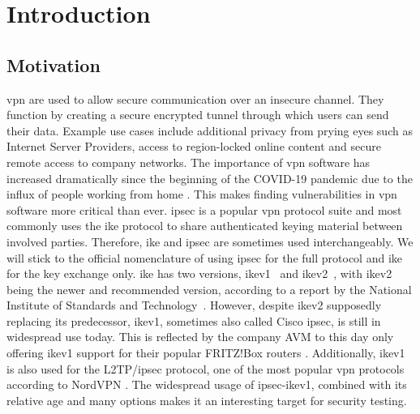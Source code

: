 %
%
% 

\chapter{Introduction}

\label{chap:Introduction}

\section{Motivation}
\ac{vpn} are used to allow secure communication over an insecure channel. They function by creating a secure encrypted tunnel through which users can send their data. Example use cases include additional privacy from prying eyes such as Internet Server Providers, access to region-locked online content and secure remote access to company networks. The importance of \ac{vpn} software has increased dramatically since the beginning of the COVID-19 pandemic due to the influx of people working from home \cite{DBLP:journals/cacm/FeldmannGLPPDWW21}. This makes finding vulnerabilities in \ac{vpn} software more critical than ever. %
\ac{ipsec} is a popular \ac{vpn} protocol suite and most commonly uses the \ac{ike} protocol to share authenticated keying material between involved parties. Therefore, \ac{ike} and \ac{ipsec} are sometimes used interchangeably. We will stick to the official nomenclature of using \ac{ipsec} for the full protocol and \ac{ike} for the key exchange only. \ac{ike} has two versions, \ac{ike}v1~\cite{rfc:ikev1} and \ac{ike}v2~\cite{rfc:ikev2}, with \ac{ike}v2 being the newer and recommended version, according to a report by the National Institute of Standards and Technology~\cite{nist791491}. However, despite \ac{ike}v2 supposedly replacing its predecessor, \ac{ike}v1, sometimes also called Cisco \ac{ipsec}, is still in widespread use today. This is reflected by the company AVM to this day only offering \ac{ike}v1 support for their popular FRITZ!Box routers \cite{avm2022}. Additionally, \ac{ike}v1 is also used for the L2TP/\ac{ipsec} protocol, one of the most popular \ac{vpn} protocols according to NordVPN \cite{nordvpn2021}. The widespread usage of \ac{ipsec}-\ac{ike}v1, combined with its relative age and many options makes it an interesting target for security testing.


